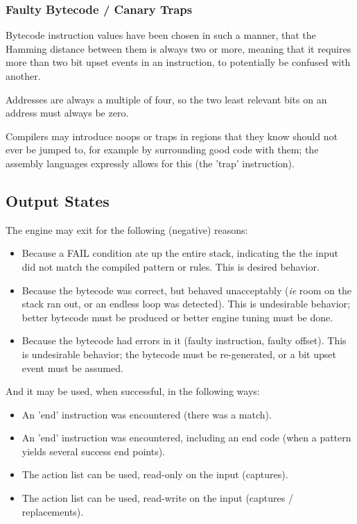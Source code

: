 \subsubsection{Faulty Bytecode / Canary Traps}

Bytecode instruction values have been chosen in such a manner, that the
Hamming distance between them is always two or more, meaning that it
requires more than two bit upset events in an instruction, to potentially
be confused with another.

Addresses are always a multiple of four, so the two least relevant bits
on an address must always be zero.

Compilers may introduce noops or traps in regions that they know should
not ever be jumped to, for example by surrounding good code with them;
the assembly languages expressly allows for this (the 'trap' instruction).

\subsection{Output States}

The engine may exit for the following (negative) reasons:

\begin{itemize}

\item Because a FAIL condition ate up the entire stack, indicating
the the input did not match the compiled pattern or rules.
This is desired behavior.

\item Because the bytecode was correct, but behaved unacceptably
(\textit{ie} room on the stack ran out, or an endless loop was detected).
This is undesirable behavior; better bytecode must be produced
or better engine tuning must be done.

\item Because the bytecode had errors in it
(faulty instruction, faulty offset). This is undesirable behavior;
the bytecode must be re-generated, or a bit upset event must be assumed.

\end{itemize}

And it may be used, when successful, in the following ways:

\begin{itemize}

\item An 'end' instruction was encountered (there was a match).

\item An 'end' instruction was encountered, including an end code
(when a pattern yields several success end points).

\item The action list can be used, read-only on the input (captures).

\item The action list can be used, read-write on the input
(captures / replacements).

\end{itemize}

